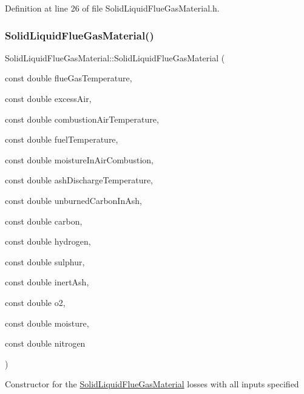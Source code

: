 Definition at line 26 of file Solid\+Liquid\+Flue\+Gas\+Material.\+h.

\mbox{\label{class_solid_liquid_flue_gas_material_a91e7c5e670b3db4fedcbc494448644d5}} 
\subsubsection{\texorpdfstring{Solid\+Liquid\+Flue\+Gas\+Material()}{SolidLiquidFlueGasMaterial()}\hspace{0.1cm}{\footnotesize\ttfamily [2/3]}}
{\footnotesize\ttfamily Solid\+Liquid\+Flue\+Gas\+Material\+::\+Solid\+Liquid\+Flue\+Gas\+Material (\begin{DoxyParamCaption}\item[{const double}]{flue\+Gas\+Temperature,  }\item[{const double}]{excess\+Air,  }\item[{const double}]{combustion\+Air\+Temperature,  }\item[{const double}]{fuel\+Temperature,  }\item[{const double}]{moisture\+In\+Air\+Combustion,  }\item[{const double}]{ash\+Discharge\+Temperature,  }\item[{const double}]{unburned\+Carbon\+In\+Ash,  }\item[{const double}]{carbon,  }\item[{const double}]{hydrogen,  }\item[{const double}]{sulphur,  }\item[{const double}]{inert\+Ash,  }\item[{const double}]{o2,  }\item[{const double}]{moisture,  }\item[{const double}]{nitrogen }\end{DoxyParamCaption})\hspace{0.3cm}{\ttfamily [inline]}}

Constructor for the \hyperlink{class_solid_liquid_flue_gas_material}{Solid\+Liquid\+Flue\+Gas\+Material} losses with all inputs specified


